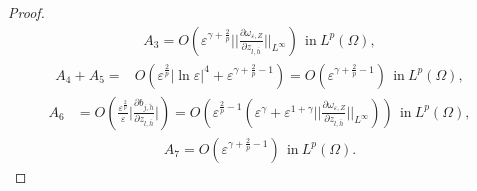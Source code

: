 \documentclass[12pt,reqno]{amsart}
\numberwithin{equation}{section}
\theoremstyle{definition}
\theoremstyle{remark}
\begin{document}
\begin{proof}
\begin{equation*}
\end{equation*}
\begin{equation*}
\begin{split}
A_3=O\left(  \varepsilon^{\gamma+\frac{2}{p}}\bigg|\bigg|\frac{\partial \omega_{\varepsilon,Z} }{\partial z_{l,\bar{h}}}\bigg|\bigg|_{L^\infty}\right)\ \ \text{in}\ L^p(\Omega),
\end{split}
\end{equation*}
\begin{equation*}
\begin{split}
A_4+A_5=&O\left( \varepsilon^{\frac{2}{p}}|\ln\varepsilon|^{4}+  \varepsilon^{\gamma+\frac{2}{p}-1}\right) =O\left(  \varepsilon^{\gamma+\frac{2}{p}-1}\right)\ \ \text{in}\ L^p(\Omega),
\end{split}
\end{equation*}
\begin{equation*}
\begin{split}
A_6&=O\left(   \frac{\varepsilon^{ \frac{2}{p}}}{\varepsilon}\bigg|\frac{\partial b_{j,\tilde{h}}}{\partial z_{l,\bar{h}}}\bigg|\right)=O\left(   \varepsilon^{ \frac{2}{p}-1}\left(   \varepsilon^\gamma +  \varepsilon^{1+\gamma}   \bigg|\bigg|\frac{\partial \omega_{\varepsilon,Z} }{\partial z_{l,\bar{h}}}\bigg|\bigg|_{L^\infty}\right) \right)\ \ \text{in}\ L^p(\Omega),
\end{split}
\end{equation*}
\begin{equation*}
\begin{split}
A_7=O\left(  \varepsilon^{\gamma+\frac{2}{p}-1}\right)\ \ \text{in}\ L^p(\Omega).

\end{split}
\end{equation*}
\end{proof}
\end{document}
